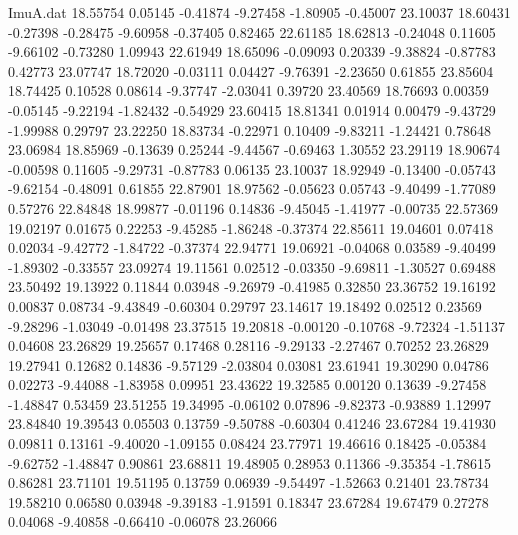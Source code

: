 \begin{filecontents}{ImuA.dat}
  18.55754    0.05145   -0.41874   -9.27458   -1.80905   -0.45007   23.10037
  18.60431   -0.27398   -0.28475   -9.60958   -0.37405    0.82465   22.61185
  18.62813   -0.24048    0.11605   -9.66102   -0.73280    1.09943   22.61949
  18.65096   -0.09093    0.20339   -9.38824   -0.87783    0.42773   23.07747
  18.72020   -0.03111    0.04427   -9.76391   -2.23650    0.61855   23.85604
  18.74425    0.10528    0.08614   -9.37747   -2.03041    0.39720   23.40569
  18.76693    0.00359   -0.05145   -9.22194   -1.82432   -0.54929   23.60415
  18.81341    0.01914    0.00479   -9.43729   -1.99988    0.29797   23.22250
  18.83734   -0.22971    0.10409   -9.83211   -1.24421    0.78648   23.06984
  18.85969   -0.13639    0.25244   -9.44567   -0.69463    1.30552   23.29119
  18.90674   -0.00598    0.11605   -9.29731   -0.87783    0.06135   23.10037
  18.92949   -0.13400   -0.05743   -9.62154   -0.48091    0.61855   22.87901
  18.97562   -0.05623    0.05743   -9.40499   -1.77089    0.57276   22.84848
  18.99877   -0.01196    0.14836   -9.45045   -1.41977   -0.00735   22.57369
  19.02197    0.01675    0.22253   -9.45285   -1.86248   -0.37374   22.85611
  19.04601    0.07418    0.02034   -9.42772   -1.84722   -0.37374   22.94771
  19.06921   -0.04068    0.03589   -9.40499   -1.89302   -0.33557   23.09274
  19.11561    0.02512   -0.03350   -9.69811   -1.30527    0.69488   23.50492
  19.13922    0.11844    0.03948   -9.26979   -0.41985    0.32850   23.36752
  19.16192    0.00837    0.08734   -9.43849   -0.60304    0.29797   23.14617
  19.18492    0.02512    0.23569   -9.28296   -1.03049   -0.01498   23.37515
  19.20818   -0.00120   -0.10768   -9.72324   -1.51137    0.04608   23.26829
  19.25657    0.17468    0.28116   -9.29133   -2.27467    0.70252   23.26829
  19.27941    0.12682    0.14836   -9.57129   -2.03804    0.03081   23.61941
  19.30290    0.04786    0.02273   -9.44088   -1.83958    0.09951   23.43622
  19.32585    0.00120    0.13639   -9.27458   -1.48847    0.53459   23.51255
  19.34995   -0.06102    0.07896   -9.82373   -0.93889    1.12997   23.84840
  19.39543    0.05503    0.13759   -9.50788   -0.60304    0.41246   23.67284
  19.41930    0.09811    0.13161   -9.40020   -1.09155    0.08424   23.77971
  19.46616    0.18425   -0.05384   -9.62752   -1.48847    0.90861   23.68811
  19.48905    0.28953    0.11366   -9.35354   -1.78615    0.86281   23.71101
  19.51195    0.13759    0.06939   -9.54497   -1.52663    0.21401   23.78734
  19.58210    0.06580    0.03948   -9.39183   -1.91591    0.18347   23.67284
  19.67479    0.27278    0.04068   -9.40858   -0.66410   -0.06078   23.26066

\end{filecontents}
